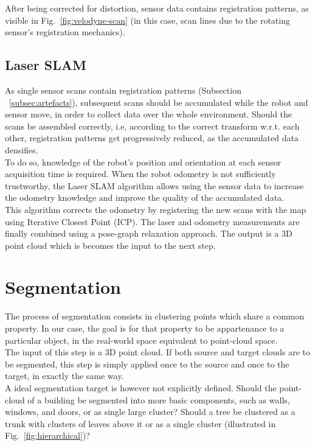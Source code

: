 After being corrected for distortion, sensor data contains registration patterns, as visible in Fig.~\ref{fig:velodyne-scan} (in this case, scan lines due to the rotating sensor's registration mechanics).

\subsection{Laser SLAM}
\label{subsec:SLAM}

As single sensor scans contain registration patterns (Subsection ~\ref{subsec:artefacts}), subsequent scans should be accumulated while the robot and sensor move, in order to collect data over the whole environment. Should the scans be assembled correctly, i.e, according to the correct transform w.r.t. each other, registration patterns get progressively reduced, as the accumulated data densifies.\\

To do so, knowledge of the robot's position and orientation at each sensor acquisition time is required. When the robot odometry is not sufficiently trustworthy, the Laser SLAM algorithm allows using the sensor data to increase the odometry knowledge and improve the quality of the accumulated data.\\

This algorithm corrects the odometry by registering the new scans with the map using Iterative Closest Point (ICP). The laser and odometry measurements are finally combined using a pose-graph relaxation approach. The output is a 3D point cloud which is becomes the input to the next step.

\section{Segmentation}
\label{sec:segmentation}

The process of segmentation consists in clustering points which share a common property. In our case, the goal is for that property to be appartenance to a particular object, in the real-world space equivalent to point-cloud space.\\

The input of this step is a 3D point cloud. If both source and target clouds are to be segmented, this step is simply applied once to the source and once to the target, in exactly the same way.\\

A ideal segmentation target is however not explicitly defined. Should the point-cloud of a building be segmented into more basic components, such as walls, windows, and doors, or as single large cluster? Should a tree be clustered as a trunk with clusters of leaves above it or as a single cluster (illustrated in Fig.~\ref{fig:hierarchical})?\\

